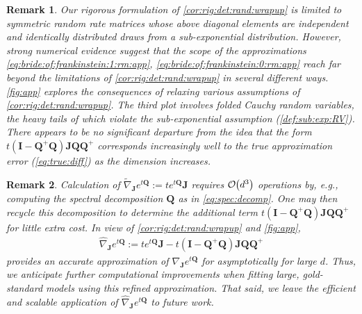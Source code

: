 \documentclass[9pt,twocolumn,twoside]{pnas-new}
\makeatletter
\newcommand{\order}[1]{{\cal O}\hspace{-0.2em}\left( #1 \right)}
\newcommand{\?}{\textbf{?}}
\newcommand{\QQ}{\mathbf{Q}}
\newcommand{\JJ}{\mathbf{J}}
\newcommand{\II}{\mathbf{I}}
\newtheorem{@remark}{\bf Remark}
\newenvironment{remark}{\begin{@remark}\rm}{\end{@remark}}
\makeatother
\begin{document}
\begin{remark}\label{rmk:non:sym:num:ev}
  Our rigorous formulation of \cref{cor:rig:det:rand:wrapup} is
  limited to symmetric random rate matrices whose above diagonal
  elements are independent and identically distributed draws from a
  sub-exponential distribution. However, strong numerical evidence
  suggest that the scope of the approximations
  \eqref{eq:bride:of:frankinstein:1:rm:app},
  \eqref{eq:bride:of:frankinstein:0:rm:app} reach far beyond the
  limitations of \cref{cor:rig:det:rand:wrapup} in several different
  ways. \cref{fig:app} explores the
  consequences of relaxing various assumptions of
  \cref{cor:rig:det:rand:wrapup}.  The third plot involves folded Cauchy random variables, the heavy tails of which violate the sub-exponential assumption (\cref{def:sub:exp:RV}).  There appears to be no
  significant departure from the idea that the form
  $t(\II -\QQ^+ \QQ) \JJ \QQ \QQ^{+}$ corresponds increasingly well to
  the true approximation error (\eqref{eq:true:diff}) as the dimension
  increases.
\end{remark}

\begin{remark}\label{rmk:better:approx}
  Calculation of
  $\widetilde{\nabla}_{\JJ} e^{t\QQ} := t e^{t\QQ} \JJ$ requires
  $\order{d^3}$ operations by, e.g., computing the spectral
  decomposition $\QQ$ as in \eqref{eq:spec:decomp}.  One may then recycle this
  decomposition to determine the
  additional term $t(\II -\QQ^+ \QQ) \JJ \QQ \QQ^{+}$ for little extra cost.  In view of
  \cref{cor:rig:det:rand:wrapup} and \cref{fig:app},
  \begin{align}\label{eq:better:help:on:sale}
    \widehat{\nabla}_{\JJ} e^{t\QQ} := t e^{t\QQ} \JJ
    -t(\II -\QQ^+ \QQ) \JJ \QQ \QQ^{+}
  \end{align}
  provides an accurate approximation of $\nabla_{\JJ} e^{t\QQ}$ for
  asymptotically for large $d$. Thus, we anticipate further computational improvements when fitting
  large, gold-standard models using this
  refined approximation.  That said, we leave the efficient and scalable application of $\widehat{\nabla}_{\JJ} e^{t\QQ}$ to future work.
\end{remark}
\end{document}
